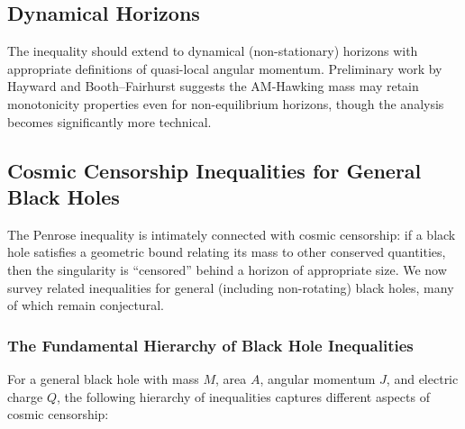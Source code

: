 \documentclass[12pt]{article}
\theoremstyle{plain}
\theoremstyle{definition}
\theoremstyle{remark}
\begin{document}
\subsection{Dynamical Horizons}

The inequality should extend to dynamical (non-stationary) horizons with appropriate definitions of quasi-local angular momentum. Preliminary work by Hayward and Booth--Fairhurst suggests the AM-Hawking mass may retain monotonicity properties even for non-equilibrium horizons, though the analysis becomes significantly more technical.

\subsection{Cosmic Censorship Inequalities for General Black Holes}\label{subsec:cosmic-censorship-ineq}

The Penrose inequality is intimately connected with cosmic censorship: if a black hole satisfies a geometric bound relating its mass to other conserved quantities, then the singularity is ``censored'' behind a horizon of appropriate size. We now survey related inequalities for general (including non-rotating) black holes, many of which remain conjectural.

\subsubsection{The Fundamental Hierarchy of Black Hole Inequalities}

For a general black hole with mass $M$, area $A$, angular momentum $J$, and electric charge $Q$, the following hierarchy of inequalities captures different aspects of cosmic censorship:
\end{document}
